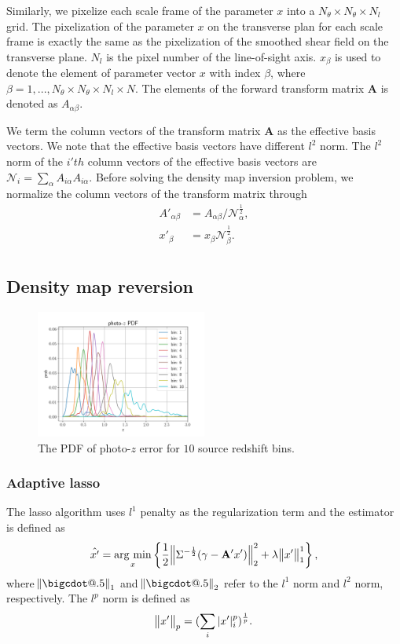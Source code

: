 \documentclass[twocolumn]{aastex62}
\makeatletter
\newcommand*\bigcdot{\mathpalette\bigcdot@{.5}}
\newcommand*\bigcdot@[2]{\mathbin{\vcenter{\hbox{\scalebox{#2}{$\m@th#1\bullet$}}}}}
\newcommand{\argmin}{\mathop{\rm arg~min}\limits}
\makeatother
\begin{document}
Similarly, we pixelize each scale frame of the parameter $x$ into a $N_\theta \times N_\theta \times N_l$ grid. 
The pixelization of the parameter $x$ on the transverse plan for each scale frame is exactly the same as the 
pixelization of the smoothed shear field on the transverse plane. $N_l$ is the pixel number of the line-of-sight 
axis. $x_{\beta}$ is used to denote the element of parameter vector $x$ with index $\beta$, where $\beta=1,...
,N_\theta \times N_\theta \times N_l \times N$. The elements of the forward transform matrix $\mathbf{A}$ is denoted 
as $A_{\alpha\beta}$.

We term the column vectors of the transform matrix $\mathbf{A}$ as the effective basis vectors. We note that the effective 
basis vectors have different $l^2$ norm. The $l^2$ norm of the $i'th$ column vectors of the effective basis vectors are 
$\mathcal{N}_{i}=\sum_\alpha A_{i\alpha}A_{i\alpha}$. Before solving the density map inversion problem, we normalize the column
vectors of the transform matrix through
\begin{equation}
\begin{split}
A'_{\alpha\beta}&=A_{\alpha\beta}/\mathcal{N}_{\alpha}^{\frac{1}{2}},\\
x'_{\beta}&=x_{\beta}\mathcal{N}_{\beta}^{\frac{1}{2}}.\\
\end{split}
\end{equation}

\subsection{Density map reversion}
\label{subsec:method-reversion}
\begin{figure}
 \centering
 \includegraphics[width=0.5\textwidth]{mlz-poz.pdf}
 \caption{The PDF of photo-$z$ error for $10$ source redshift bins.}
\end{figure}

\subsubsection{Adaptive lasso}
The lasso algorithm uses $l^1$ penalty as the regularization term and the estimator is defined as
\begin{equation}
\hat{x'}=\argmin_{x} \left\{ \frac{1}{2}\norm{\Sigma^{-\frac{1}{2}}(\gamma- \mathbf{A'} x')}_2^2+ \lambda \norm{x'}^1_1\right\},
\end{equation}
where $\norm{\bigcdot}_1$ and $\norm{\bigcdot}_2$ refer to the $l^1$ norm and $l^2$ norm, respectively. The $l^p$ norm is
defined as
\begin{equation}
\norm{x'}_p=(\sum_{i} |x'|^p_i)^{\frac{1}{p}}.
\end{equation}
\end{document}
